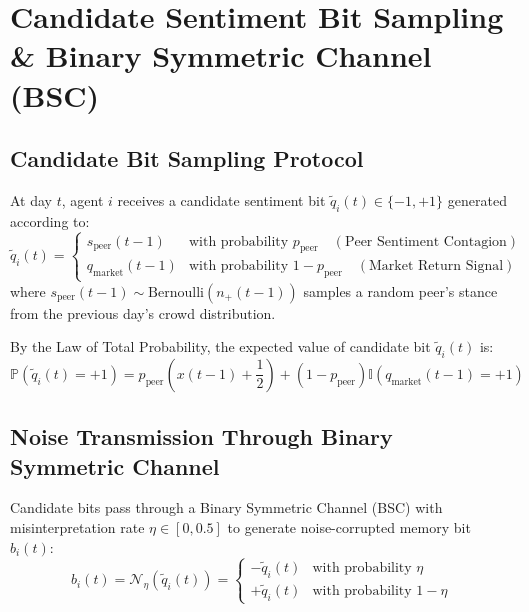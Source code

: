 \documentclass[11pt,a4paper]{article}
\begin{document}
\section{Candidate Sentiment Bit Sampling \& Binary Symmetric Channel (BSC)}

\subsection{Candidate Bit Sampling Protocol}
At day $t$, agent $i$ receives a candidate sentiment bit $\tilde{q}_i(t) \in \{-1, +1\}$ generated according to:
\begin{equation}
    \tilde{q}_i(t) = 
    \begin{cases} 
        s_{\text{peer}}(t-1) & \text{with probability } p_{\text{peer}} \quad (\text{Peer Sentiment Contagion}) \\ 
        q_{\text{market}}(t-1) & \text{with probability } 1 - p_{\text{peer}} \quad (\text{Market Return Signal}) 
    \end{cases}
\end{equation}
where $s_{\text{peer}}(t-1) \sim \text{Bernoulli}(n_+(t-1))$ samples a random peer's stance from the previous day's crowd distribution.

By the Law of Total Probability, the expected value of candidate bit $\tilde{q}_i(t)$ is:
\begin{equation}
    \mathbb{P}(\tilde{q}_i(t) = +1) = p_{\text{peer}} \left( x(t-1) + \frac{1}{2} \right) + (1 - p_{\text{peer}}) \mathbb{I}(q_{\text{market}}(t-1) = +1)
\end{equation}

\subsection{Noise Transmission Through Binary Symmetric Channel}
Candidate bits pass through a Binary Symmetric Channel (BSC) with misinterpretation rate $\eta \in [0, 0.5]$ to generate noise-corrupted memory bit $b_i(t)$:
\begin{equation}
    b_i(t) = \mathcal{N}_\eta \left( \tilde{q}_i(t) \right) = 
    \begin{cases} 
        -\tilde{q}_i(t) & \text{with probability } \eta \\ 
        +\tilde{q}_i(t) & \text{with probability } 1 - \eta 
    \end{cases}
\end{equation}
\end{document}
